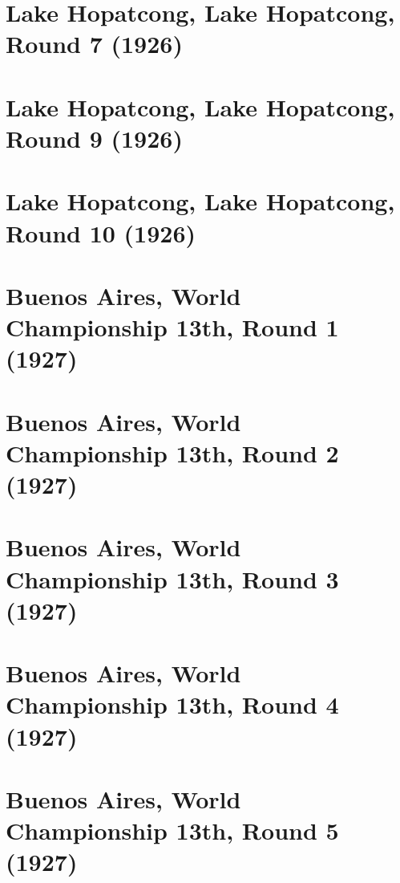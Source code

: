 \documentclass[11pt]{article}
\begin{document}
\clearpage

\section{Lake Hopatcong, Lake Hopatcong, Round 7 (1926)}


\clearpage

\section{Lake Hopatcong, Lake Hopatcong, Round 9 (1926)}


\clearpage

\section{Lake Hopatcong, Lake Hopatcong, Round 10 (1926)}


\clearpage

\section{Buenos Aires, World Championship 13th, Round 1 (1927)}


\clearpage

\section{Buenos Aires, World Championship 13th, Round 2 (1927)}


\clearpage

\section{Buenos Aires, World Championship 13th, Round 3 (1927)}


\clearpage

\section{Buenos Aires, World Championship 13th, Round 4 (1927)}


\clearpage

\section{Buenos Aires, World Championship 13th, Round 5 (1927)}

\end{document}
